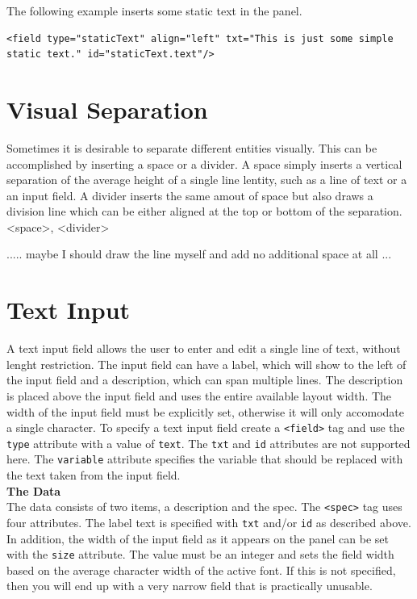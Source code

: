 The following example inserts some static text in the panel.

\footnotesize
\begin{verbatim}
<field type="staticText" align="left" txt="This is just some simple static text." id="staticText.text"/>
\end{verbatim}
\normalsize

\section{Visual Separation}

Sometimes it is desirable to separate different entities visually. This
can be accomplished by inserting a space or a divider. A space simply
inserts a vertical separation of the average height of a single line
lentity, such as a line of text or a an input field. A divider inserts
the same amout of space but also draws a division line which can be
either aligned at the top or bottom of the separation.
<space>, <divider>

 ..... maybe I should draw the line myself and add no additional space at all ...

\section{Text Input}

A text input field allows the user to enter and edit a single line of
text, without lenght restriction. The input field can have a label,
which will show to the left of the input field and a description, which
can span multiple lines. The description is placed above the input field
and uses the entire available layout width. The width of the input field
must be explicitly set, otherwise it will only accomodate a single
character. To specify a text input field create a \texttt{<field>} tag
and use the \texttt{type} attribute with a value of \texttt{text}. The
\texttt{txt} and \texttt{id} attributes are not supported here. The
\texttt{variable} attribute specifies the variable that should be
replaced with the text taken from the input field.\\

\textbf{The Data}\\

The data consists of two items, a description and the spec. The
\texttt{<spec>} tag uses four attributes. The label text is specified with
\texttt{txt} and/or \texttt{id} as described above. In addition, the
width of the input field as it appears on the panel can be set with the
\texttt{size} attribute. The value must be an integer and sets the field
width based on the average character width of the active font. If this
is not specified, then you will end up with a very narrow field that is
practically unusable.\\

